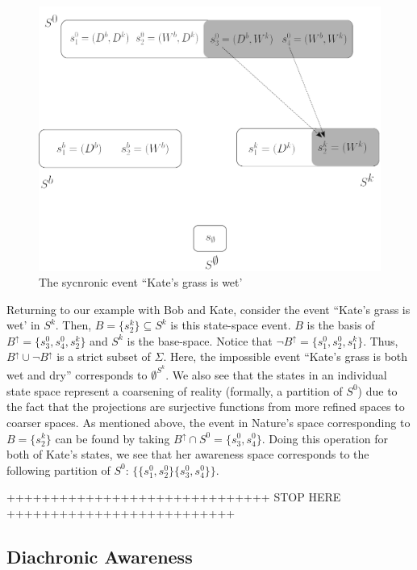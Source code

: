 \documentclass[
11pt,
titlepage,
reqno,
]{article}%
\theoremstyle{definition}
\begin{document}
	\begin{figure}[h!]	
		\begin{center}
			\includegraphics[scale=.4]{lattice-event.png}
		\end{center}
		\caption{The sycnronic event ``Kate's grass is wet'\label{lattice-event}}
	\end{figure}
	
	 Returning to our example with Bob and Kate, consider the event ``Kate's grass is wet' in $S^k$. 
	 Then, $B=\{s^k_2\}\subseteq S^k$ is this state-space event.
	 $B$ is the basis of $B^{\uparrow}=\{s^0_3,s^0_4,s^k_2\}$ and $S^k$ is the base-space.
	 Notice that $\lnot B^{\uparrow}=\{s^0_1,s^0_2,s^k_1\}$.
	 Thus, $B^{\uparrow}\cup \lnot B^{\uparrow}$ is a strict subset of $\Sigma$.
	 Here, the impossible event ``Kate's grass is both wet and dry'' corresponds to $\emptyset^{S^k}$.
	 We also see that the states in an individual state space represent a coarsening of reality (formally, a partition of $S^0$) due to the fact that the projections are surjective functions from more refined spaces to coarser spaces.
	 As mentioned above, the event in Nature's space corresponding to $B=\{s^k_2\}$ can be found by taking $B^\uparrow\cap S^0=\{s^0_3,s^0_4\}$.
	 Doing this operation for both of Kate's states, we see that her awareness space corresponds to the following partition of $S^0$: $\{\{s^0_1,s^0_2\}\{s^0_3,s^0_4\}\}$.

++++++++++++++++++++++++++++++ STOP HERE ++++++++++++++++++++++++++
\subsection{Diachronic Awareness}\label{sec:diachronic_setup}
\end{document}
